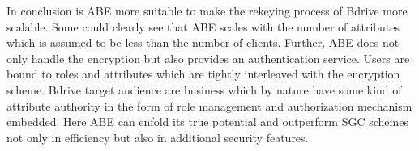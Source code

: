 
In conclusion is \ac{ABE} more suitable to make the rekeying process of Bdrive more scalable. Some could clearly see that \ac{ABE} scales with the number of attributes which is assumed to be less than the number of clients. Further, \ac{ABE} does not only handle the encryption but also provides an authentication service. Users are bound to roles and attributes which are tightly interleaved with the encryption scheme. Bdrive target audience are business which by nature have some kind of attribute authority in the form of role management and authorization mechanism embedded. Here \ac{ABE} can enfold its true potential and outperform SGC schemes not only in efficiency but also in additional security features. 